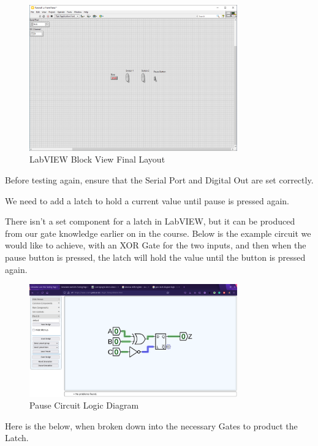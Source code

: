 \documentclass[a4paper,11pt]{report}
\begin{document}
\begin{figure}[H]
\centering
\includegraphics[width=0.8\textwidth]{screenshots/labview32}
\caption{LabVIEW Block View Final Layout}
\end{figure}

Before testing again, ensure that the Serial Port and Digital Out are set correctly.

We need to add a latch to hold a current value until pause is pressed again.

There isn't a set component for a latch in LabVIEW, but it can be produced from our gate knowledge earlier on in the course. Below is the example circuit we would like to achieve, with an XOR Gate for the two inputs, and then when the pause button is pressed, the latch will hold the value until the button is pressed again.

\begin{figure}[H]
\centering
\includegraphics[width=0.8\textwidth]{screenshots/pausecircuitlatch}
\caption{Pause Circuit Logic Diagram}
\end{figure}

Here is the below, when broken down into the necessary Gates to product the Latch.
\end{document}
